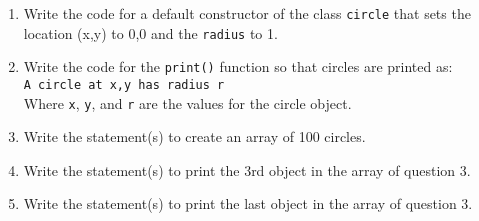 \documentclass[12pt,openbib]{article}
\begin{document}
\begin{enumerate}
\item Write the code for a default constructor of the class {\tt circle} that sets the location (x,y) to 0,0 and the {\tt radius} to 1.
\vspace{3cm}
\item Write the code for the {\tt print()} function so that circles are printed as:\\
{\tt A circle at x,y has radius r}\\
Where {\tt x}, {\tt y}, and {\tt r} are the values for the circle object.
\vspace{3cm}
\item Write the statement(s) to create an array of 100 circles.
\vspace{1cm}
\item Write the statement(s) to print the 3rd object in the array of question 3.
\vspace{1cm}
\item Write the statement(s) to print the last object in the array of question 3.


\end{enumerate}
\end{document}
